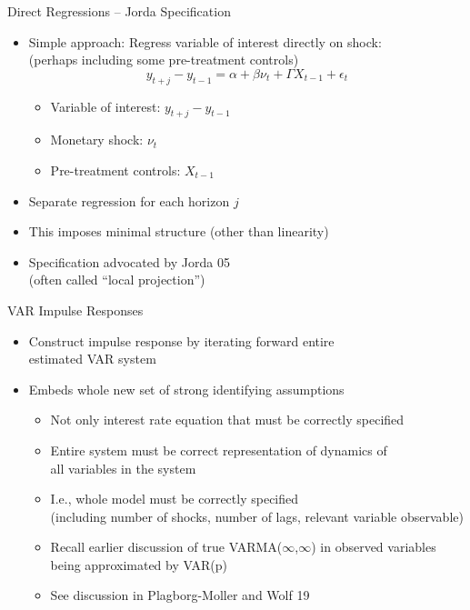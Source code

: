 \documentclass[11pt,aspectratio=169,xcolor={dvipsnames},hyperref={pdftex,pdfpagemode=UseNone,hidelinks,pdfdisplaydoctitle=true},usepdftitle=false]{beamer}
\begin{document}
\begin{frame}{Direct Regressions -- Jorda Specification}
\begin{itemize}
\item Simple approach: Regress variable of interest directly on shock: \\ (perhaps including some pre-treatment controls)
\[ y_{t+j} - y_{t-1} = \alpha + \beta \nu_{t} + \Gamma X_{t-1} + \epsilon_{t} \] \vspace{-15pt}
\begin{itemize}
\item Variable of interest: $y_{t+j} - y_{t-1}$
\item Monetary shock: $\nu_{t}$
\item Pre-treatment controls: $X_{t-1}$
\end{itemize}
\item Separate regression for each horizon $j$
\item This imposes minimal structure (other than linearity) 
\item Specification advocated by Jorda 05 \\ (often called ``local projection'')
\end{itemize}
\end{frame}


\begin{frame}{VAR Impulse Responses}
\begin{itemize}
\itemsep1em 
\item Construct impulse response by iterating forward entire \\ estimated VAR system
\item Embeds whole new set of strong identifying assumptions
\begin{itemize}
\item Not only interest rate equation that must be correctly specified
\item Entire system must be correct representation of dynamics of \\ all variables in the system
\item I.e., whole model must be correctly specified \\ (including number of shocks, number of lags, relevant variable observable)
\item Recall earlier discussion of true VARMA($\infty$,$\infty$) in observed variables being approximated by VAR(p)
\item See discussion in Plagborg-Moller and Wolf 19
\end{itemize}
\end{itemize}
\end{frame}
\end{document}
